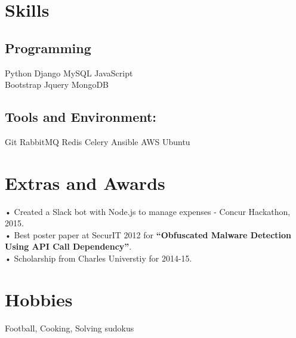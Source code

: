 \documentclass[]{deedy-resume-openfont}
\begin{document}
\begin{minipage}[t]{0.33\textwidth}
\section{Skills}
\subsection{Programming}
Python \textbullet{} Django \textbullet{} MySQL \textbullet{} JavaScript \\
Bootstrap \textbullet{} Jquery \textbullet{} MongoDB  \\
\subsection{Tools and Environment:}
Git \textbullet{} RabbitMQ \textbullet{} Redis \textbullet{} Celery \textbullet{}  Ansible \textbullet{} AWS \textbullet{} Ubuntu\\
\sectionsep


\section{Extras and Awards}
• Created a Slack bot with Node.js to manage expenses - Concur Hackathon, 2015. \\
• Best poster paper at SecurIT 2012 for \textbf{“Obfuscated Malware Detection Using API Call Dependency”}. \\
• Scholarship from Charles Universtiy for 2014-15. \\
\sectionsep


\section{Hobbies}
Football, Cooking, Solving sudokus
\sectionsep

%
%

\end{minipage}
\hfill
\end{document}
